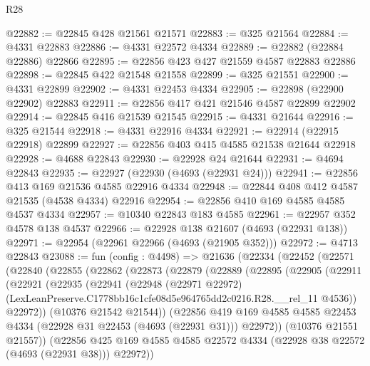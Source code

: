 \begin{lexlean}{R28}
\begin{coremodule}
@22882 := @22845 @428 @21561 @21571
@22883 := @325 @21564
@22884 := @4331 @22883
@22886 := @4331 @22572 @4334
@22889 := @22882 (@22884 @22886) @22866
@22895 := @22856 @423 @427 @21559 @4587 @22883 @22886
@22898 := @22845 @422 @21548 @21558
@22899 := @325 @21551
@22900 := @4331 @22899
@22902 := @4331 @22453 @4334
@22905 := @22898 (@22900 @22902) @22883
@22911 := @22856 @417 @421 @21546 @4587 @22899 @22902
@22914 := @22845 @416 @21539 @21545
@22915 := @4331 @21644
@22916 := @325 @21544
@22918 := @4331 @22916 @4334
@22921 := @22914 (@22915 @22918) @22899
@22927 := @22856 @403 @415 @4585 @21538 @21644 @22918
@22928 := @4688 @22843
@22930 := @22928 @24 @21644
@22931 := @4694 @22843
@22935 := @22927 (@22930 (@4693 (@22931 @24)))
@22941 := @22856 @413 @169 @21536 @4585 @22916 @4334
@22948 := @22844 @408 @412 @4587 @21535 (@4538 @4334) @22916
@22954 := @22856 @410 @169 @4585 @4585 @4537 @4334
@22957 := @10340 @22843 @183 @4585
@22961 := @22957 @352 @4578 @138 @4537
@22966 := @22928 @138 @21607 (@4693 (@22931 @138))
@22971 := @22954 (@22961 @22966 (@4693 (@21905 @352)))
@22972 := @4713 @22843
@23088 := fun (config : @4498) =>
  @21636
    (@22334
      (@22452
        (@22571
          (@22840
            (@22855
              (@22862
                (@22873
                  (@22879
                    (@22889
                      (@22895
                        (@22905
                          (@22911
                            (@22921
                              (@22935
                                (@22941
                                  (@22948
                                    (@22971 @22972)
                                    (LexLeanPreserve.C1778bb16c1cfe08d5e964765dd2c0216.R28.__rel_11
                                      @4536))
                                  @22972))
                              (@10376 @21542 @21544))
                            (@22856
                              @419
                              @169
                              @4585
                              @4585
                              @22453
                              @4334
                              (@22928 @31 @22453 (@4693 (@22931 @31)))
                              @22972))
                          (@10376 @21551 @21557))
                        (@22856
                          @425
                          @169
                          @4585
                          @4585
                          @22572
                          @4334
                          (@22928 @38 @22572 (@4693 (@22931 @38)))
                          @22972))

\end{coremodule}
\end{lexlean}
